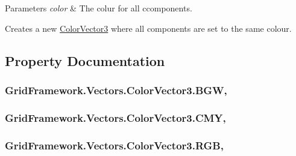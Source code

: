 \begin{DoxyParams}{Parameters}
{\em color} & The colur for all ccomponents.\\
\hline
\end{DoxyParams}
Creates a new \hyperlink{class_grid_framework_1_1_vectors_1_1_color_vector3}{Color\+Vector3} where all components are set to the same colour. 

\subsection{Property Documentation}
\hypertarget{class_grid_framework_1_1_vectors_1_1_color_vector3_abebe831b35fa575943e5aafe639dcc10_abebe831b35fa575943e5aafe639dcc10}{
\subsubsection[{B\+G\+W}]{ Grid\+Framework.\+Vectors.\+Color\+Vector3.\+B\+G\+W\hspace{0.3cm}{\ttfamily [static]}, {\ttfamily [get]}}}\label{class_grid_framework_1_1_vectors_1_1_color_vector3_abebe831b35fa575943e5aafe639dcc10_abebe831b35fa575943e5aafe639dcc10}
\hypertarget{class_grid_framework_1_1_vectors_1_1_color_vector3_a0c2522e5dab78bb91d254bc0cd88ec0f_a0c2522e5dab78bb91d254bc0cd88ec0f}{
\subsubsection[{C\+M\+Y}]{ Grid\+Framework.\+Vectors.\+Color\+Vector3.\+C\+M\+Y\hspace{0.3cm}{\ttfamily [static]}, {\ttfamily [get]}}}\label{class_grid_framework_1_1_vectors_1_1_color_vector3_a0c2522e5dab78bb91d254bc0cd88ec0f_a0c2522e5dab78bb91d254bc0cd88ec0f}
\hypertarget{class_grid_framework_1_1_vectors_1_1_color_vector3_aeeafb94ea145ed8d92494a60932b41ff_aeeafb94ea145ed8d92494a60932b41ff}{
\subsubsection[{R\+G\+B}]{ Grid\+Framework.\+Vectors.\+Color\+Vector3.\+R\+G\+B\hspace{0.3cm}{\ttfamily [static]}, {\ttfamily [get]}}}\label{class_grid_framework_1_1_vectors_1_1_color_vector3_aeeafb94ea145ed8d92494a60932b41ff_aeeafb94ea145ed8d92494a60932b41ff}
